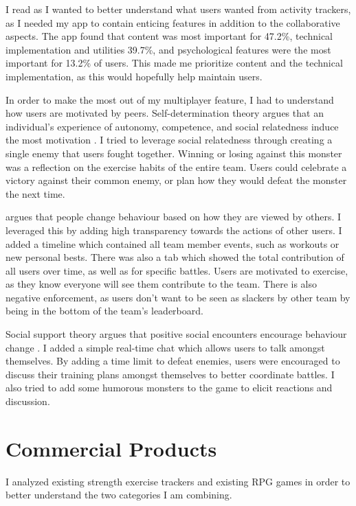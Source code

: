 \documentclass{l4proj}
\begin{document}
I read \citet{User_expectations} as I wanted to better understand what users wanted from activity trackers, as I needed my app to contain enticing features in addition to the collaborative aspects. The app found that content was most important for 47.2\%, technical implementation and utilities 39.7\%, and psychological features were the most important for 13.2\% of users. This made me prioritize content and the technical implementation, as this would hopefully help maintain users.

In order to make the most out of my multiplayer feature, I had to understand how users are motivated by peers. Self-determination theory argues that an individual's experience of autonomy, competence, and social relatedness induce the most motivation \citep{self_determination_theory}. I tried to leverage social relatedness through creating a single enemy that users fought together. Winning or losing against this monster was a reflection on the exercise habits of the entire team. Users could celebrate a victory against their common enemy, or plan how they would defeat the monster the next time.

\citet{social_comparison_theory} argues that people change behaviour based on how they are viewed by others. I leveraged this by adding high transparency towards the actions of other users. I added a timeline which contained all team member events, such as workouts or new personal bests. There was also a tab which showed the total contribution of all users over time, as well as for specific battles. Users are motivated to exercise, as they know everyone will see them contribute to the team. There is also negative enforcement, as users don't want to be seen as slackers by other team by being in the bottom of the team's leaderboard.

Social support theory argues that positive social encounters encourage behaviour change \citep{social_support_theory}. I added a simple real-time chat which allows users to talk amongst themselves. By adding a time limit to defeat enemies, users were encouraged to discuss their training plans amongst themselves to better coordinate battles. I also tried to add some humorous monsters to the game to elicit reactions and discussion. 

\section{Commercial Products}
I analyzed existing strength exercise trackers and existing RPG games in order to better understand the two categories I am combining. 
\end{document}
